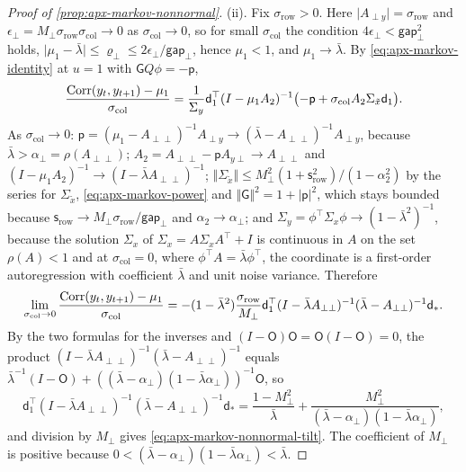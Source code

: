\begin{proof}[Proof of \cref{prop:apx-markov-nonnormal}]
(ii). Fix $\sigma_{\mathrm{row}}>0$. Here $\lvert A_{\perp y}\rvert=\sigma_{\mathrm{row}}$ and $\epsilon_\perp=M_\perp\sigma_{\mathrm{row}}\sigma_{\mathrm{col}}\to0$ as $\sigma_{\mathrm{col}}\to0$, so for small $\sigma_{\mathrm{col}}$ the condition $4\epsilon_\perp<\mathsf{gap}_\perp^2$ holds, $\lvert\mu_1-\bar\lambda\rvert\le\varrho_\perp\le2\epsilon_\perp/\mathsf{gap}_\perp$, hence $\mu_1<1$, and $\mu_1\to\bar\lambda$. By \eqref{eq:apx-markov-identity} at $u=1$ with $\mathsf GQ\phi=-\mathsf p$,
\begin{equation*}
\frac{\operatorname{Corr}(y_t,y_{t+1})-\mu_1}{\sigma_{\mathrm{col}}}=\frac1{\Sigma_y}\mathsf d_1^\top(I-\mu_1A_2)^{-1}\bigl(-\mathsf p+\sigma_{\mathrm{col}}A_2\Sigma_{\tilde x}\mathsf d_1\bigr).
\end{equation*}
As $\sigma_{\mathrm{col}}\to0$: $\mathsf p=(\mu_1-A_{\perp\perp})^{-1}A_{\perp y}\to(\bar\lambda-A_{\perp\perp})^{-1}A_{\perp y}$, because $\bar\lambda>\alpha_\perp=\rho(A_{\perp\perp})$; $A_2=A_{\perp\perp}-\mathsf pA_{y\perp}\to A_{\perp\perp}$ and $(I-\mu_1A_2)^{-1}\to(I-\bar\lambda A_{\perp\perp})^{-1}$; $\Vert\Sigma_{\tilde x}\Vert\le M_\perp^2(1+\mathsf s_{\mathrm{row}}^2)/(1-\alpha_2^2)$ by the series for $\Sigma_{\tilde x}$, \eqref{eq:apx-markov-power} and $\Vert\mathsf G\Vert^2=1+\lvert\mathsf p\rvert^2$, which stays bounded because $\mathsf s_{\mathrm{row}}\to M_\perp\sigma_{\mathrm{row}}/\mathsf{gap}_\perp$ and $\alpha_2\to\alpha_\perp$; and $\Sigma_y=\phi^\top\Sigma_x\phi\to(1-\bar\lambda^2)^{-1}$, because the solution $\Sigma_x$ of $\Sigma_x=A\Sigma_xA^\top+I$ is continuous in $A$ on the set $\rho(A)<1$ and at $\sigma_{\mathrm{col}}=0$, where $\phi^\top A=\bar\lambda\phi^\top$, the coordinate is a first-order autoregression with coefficient $\bar\lambda$ and unit noise variance. Therefore
\begin{equation*}
\lim_{\sigma_{\mathrm{col}}\to0}\frac{\operatorname{Corr}(y_t,y_{t+1})-\mu_1}{\sigma_{\mathrm{col}}}=-(1-\bar\lambda^2)\frac{\sigma_{\mathrm{row}}}{M_\perp}\mathsf d_1^\top(I-\bar\lambda A_{\perp\perp})^{-1}(\bar\lambda-A_{\perp\perp})^{-1}\mathsf d_\ast .
\end{equation*}
By the two formulas for the inverses and $(I-\mathsf O)\mathsf O=\mathsf O(I-\mathsf O)=0$, the product $(I-\bar\lambda A_{\perp\perp})^{-1}(\bar\lambda-A_{\perp\perp})^{-1}$ equals $\bar\lambda^{-1}(I-\mathsf O)+((\bar\lambda-\alpha_\perp)(1-\bar\lambda\alpha_\perp))^{-1}\mathsf O$, so
\begin{equation*}
\mathsf d_1^\top(I-\bar\lambda A_{\perp\perp})^{-1}(\bar\lambda-A_{\perp\perp})^{-1}\mathsf d_\ast=\frac{1-M_\perp^2}{\bar\lambda}+\frac{M_\perp^2}{(\bar\lambda-\alpha_\perp)(1-\bar\lambda\alpha_\perp)},
\end{equation*}
and division by $M_\perp$ gives \eqref{eq:apx-markov-nonnormal-tilt}. The coefficient of $M_\perp$ is positive because $0<(\bar\lambda-\alpha_\perp)(1-\bar\lambda\alpha_\perp)<\bar\lambda$.


\end{proof}
